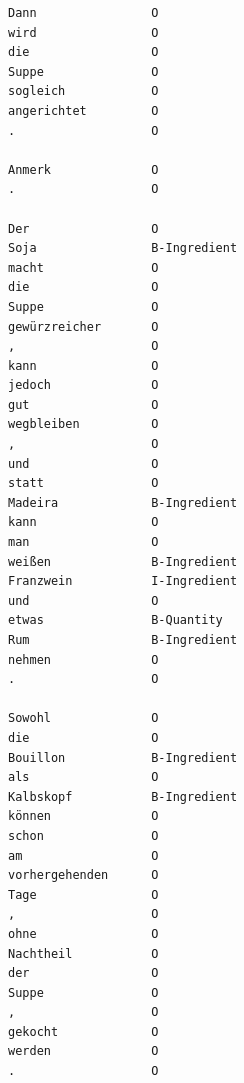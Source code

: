 \documentclass[12pt, twoside]{report}
\begin{document}
\begin{lstlisting}
Dann                O
wird                O
die                 O
Suppe               O
sogleich            O
angerichtet         O
.                   O

Anmerk              O
.                   O

Der                 O
Soja                B-Ingredient
macht               O
die                 O
Suppe               O
gewürzreicher       O
,                   O
kann                O
jedoch              O
gut                 O
wegbleiben          O
,                   O
und                 O
statt               O
Madeira             B-Ingredient
kann                O
man                 O
weißen              B-Ingredient
Franzwein           I-Ingredient
und                 O
etwas               B-Quantity
Rum                 B-Ingredient
nehmen              O
.                   O

Sowohl              O
die                 O
Bouillon            B-Ingredient
als                 O
Kalbskopf           B-Ingredient
können              O
schon               O
am                  O
vorhergehenden      O
Tage                O
,                   O
ohne                O
Nachtheil           O
der                 O
Suppe               O
,                   O
gekocht             O
werden              O
.                   O

\end{lstlisting}
\end{document}
